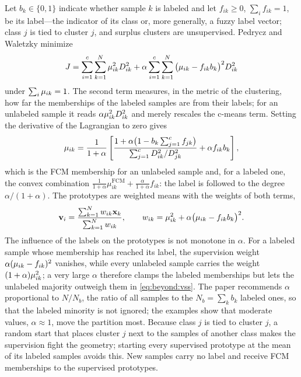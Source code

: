 Let $b_k\in\{0,1\}$ indicate whether sample $k$ is labeled and let $f_{ik}\ge0$, $\sum_i f_{ik}=1$, be its label---the indicator of its class or, more generally, a fuzzy label vector; class $j$ is tied to cluster $j$, and surplus clusters are unsupervised. Pedrycz and Waletzky \cite{pedrycz:1997:ssfcm} minimize
\begin{equation}
  J=\sum_{i=1}^{c}\sum_{k=1}^{N}\mu_{ik}^2D^2_{ik}+\alpha\sum_{i=1}^{c}\sum_{k=1}^{N}\big(\mu_{ik}-f_{ik}b_k\big)^2D^2_{ik}
  \label{eq:beyond:Jss}
\end{equation}
under $\sum_i\mu_{ik}=1$. The second term measures, in the metric of the clustering, how far the memberships of the labeled samples are from their labels; for an unlabeled sample it reads $\alpha\mu_{ik}^2D^2_{ik}$ and merely rescales the c-means term. Setting the derivative of the Lagrangian to zero gives
\begin{equation}
  \mu_{ik}=\frac{1}{1+\alpha}\left[\frac{1+\alpha\big(1-b_k\sum_{j=1}^{c}f_{jk}\big)}{\sum_{j=1}^{c}D^2_{ik}/D^2_{jk}}+\alpha f_{ik}b_k\right],
  \label{eq:beyond:muss}
\end{equation}
which is the FCM membership for an unlabeled sample and, for a labeled one, the convex combination $\frac{1}{1+\alpha}\mu^{\mathrm{FCM}}_{ik}+\frac{\alpha}{1+\alpha}f_{ik}$: the label is followed to the degree $\alpha/(1+\alpha)$. The prototypes are weighted means with the weights of both terms,
\begin{equation}
  \mathbf{v}_i=\frac{\sum_{k=1}^{N}w_{ik}\mathbf{x}_k}{\sum_{k=1}^{N}w_{ik}},\qquad w_{ik}=\mu_{ik}^2+\alpha\big(\mu_{ik}-f_{ik}b_k\big)^2 .
  \label{eq:beyond:vss}
\end{equation}
The influence of the labels on the prototypes is not monotone in $\alpha$. For a labeled sample whose membership has reached its label, the supervision weight $\alpha(\mu_{ik}-f_{ik})^2$ vanishes, while every unlabeled sample carries the weight $(1+\alpha)\mu_{ik}^2$; a very large $\alpha$ therefore clamps the labeled memberships but lets the unlabeled majority outweigh them in \eqref{eq:beyond:vss}. The paper recommends $\alpha$ proportional to $N/N_b$, the ratio of all samples to the $N_b=\sum_k b_k$ labeled ones, so that the labeled minority is not ignored; the examples show that moderate values, $\alpha\approx1$, move the partition most. Because class $j$ is tied to cluster $j$, a random start that places cluster $j$ next to the samples of another class makes the supervision fight the geometry; starting every supervised prototype at the mean of its labeled samples avoids this. New samples carry no label and receive FCM memberships to the supervised prototypes.

